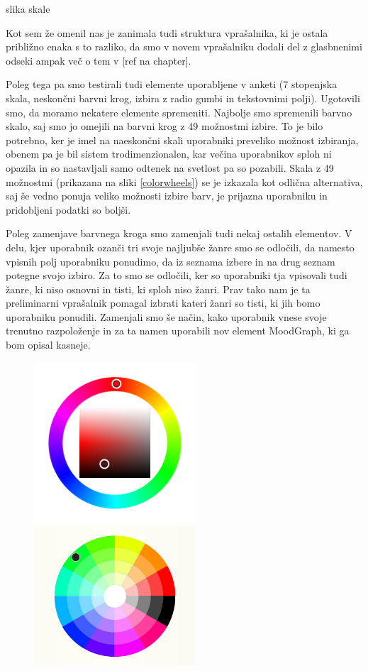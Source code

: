 \documentclass[a4paper, 12pt]{book}
\begin{document}
{slika skale

Kot sem že omenil nas je zanimala tudi struktura vprašalnika, ki je ostala približno enaka s to razliko, da smo v novem vprašalniku dodali del z glasbnenimi odseki ampak več o tem v [ref na chapter].

Poleg tega pa smo testirali tudi elemente uporabljene v anketi (7 stopenjska skala, neskončni barvni krog, izbira z radio gumbi in tekstovnimi polji). Ugotovili smo, da moramo nekatere elemente spremeniti. Najbolje smo spremenili barvno skalo, saj smo jo omejili na barvni krog z 49 možnostmi izbire. To je bilo potrebno, ker je imel na naeskončni skali uporabniki preveliko možnost izbiranja, obenem pa je bil sistem trodimenzionalen, kar večina uporabnikov sploh ni opazila in so nastavljali samo odtenek na svetlost pa so pozabili. Skala z 49 možnostmi (prikazana na sliki \ref{colorwheels}) se je izkazala kot odlična alternativa, saj še vedno ponuja veliko možnosti izbire barv, je prijazna uporabniku in pridobljeni podatki so boljši.

Poleg zamenjave barvnega kroga smo zamenjali tudi nekaj ostalih elementov. V delu, kjer uporabnik ozanči tri svoje najljubše žanre smo se odločili, da namesto vpisnih polj uporabniku ponudimo, da iz seznama izbere in na drug seznam potegne svojo izbiro. Za to smo se odločili, ker so uporabniki tja vpisovali tudi žanre, ki niso osnovni in tisti, ki sploh niso žanri. Prav tako nam je ta preliminarni vprašalnik pomagal izbrati kateri žanri so tisti, ki jih bomo uporabniku ponudili. Zamenjali smo še način, kako uporabnik vnese svoje trenutno razpoloženje in za ta namen uporabili nov element MoodGraph, ki ga bom opisal kasneje. 

\begin{figure}[ht]
\centering
\includegraphics[width=60mm]{colorwheelold.png}
\includegraphics[width=60mm]{colorwheel.png}


\end{figure}}
\end{document}
